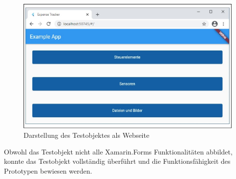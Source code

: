 \begin{figure}[!ht]
 \includegraphics[width=\textwidth,keepaspectratio]{Images/Implementation/WebApp.png}
 \caption{Darstellung des Testobjektes als Webseite}
 \label{fig:WebView}
\end{figure}



Obwohl das Testobjekt nicht alle  Xamarin.Forms Funktionalitäten abbildet,  konnte das Testobjekt vollständig überführt und die Funktionsfähigkeit des Prototypen bewiesen werden.  

